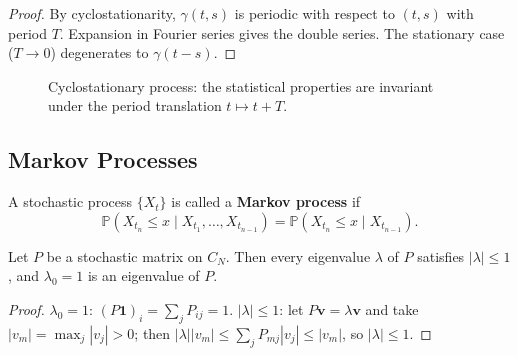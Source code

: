 \begin{proof}
By cyclostationarity, $\gamma(t, s)$ is periodic with respect to $(t, s)$ with period $T$. Expansion in Fourier series gives the double series. The stationary case ($T \to 0$) degenerates to $\gamma(t-s)$.
\end{proof}

\begin{figure}[htbp]
\centering
{}
\caption{Cyclostationary process: the statistical properties are invariant under the period translation $t\mapsto t+T$.}
\label{fig:cyclostationary}
\end{figure}

\subsection{Markov Processes}

\begin{definition}\label{def:markov_process}
A stochastic process $\{X_t\}$ is called a \textbf{Markov process} if
\[
\mathbb{P}(X_{t_n} \le x \mid X_{t_1}, \dots, X_{t_{n-1}}) = \mathbb{P}(X_{t_n} \le x \mid X_{t_{n-1}}).
\]
\end{definition}

\begin{lemma}\label{ch14_transition_spectral_radius}
Let $P$ be a stochastic matrix on $C_N$. Then every eigenvalue $\lambda$ of $P$ satisfies $|\lambda| \le 1$, and $\lambda_0 = 1$ is an eigenvalue of $P$.
\end{lemma}

\begin{proof}
$\lambda_0 = 1$: $(P\mathbf{1})_i = \sum_j P_{ij} = 1$. $|\lambda| \le 1$: let $P\mathbf{v} = \lambda\mathbf{v}$ and take $|v_m| = \max_j |v_j| > 0$; then $|\lambda||v_m| \le \sum_j P_{mj}|v_j| \le |v_m|$, so $|\lambda| \le 1$.
\end{proof}

